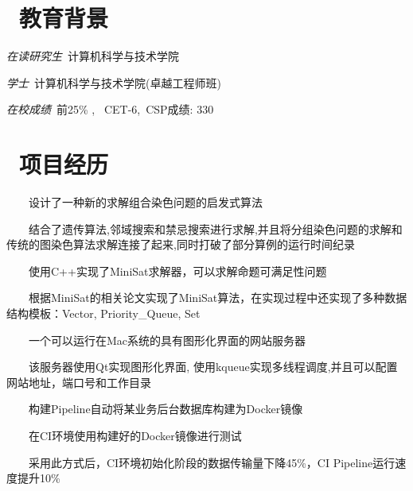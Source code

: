 \documentclass[10pt]{resume}
\begin{document}
\footnotesize


 
 
\section{\faGraduationCap\  教育背景}

\textit{在读研究生}\ 计算机科学与技术学院

\textit{学士}\ 计算机科学与技术学院(卓越工程师班)

\textit{在校成绩}\  前25\% , \ CET-6,\ CSP成绩: 330

\section{\faUsers\ 项目经历}
\ \ \ \ 设计了一种新的求解组合染色问题的启发式算法

\ \ \ \ 结合了遗传算法,邻域搜索和禁忌搜索进行求解,并且将分组染色问题的求解和传统的图染色算法求解连接了起来,同时打破了部分算例的运行时间纪录


\begin{onehalfspacing}
\ \ \ \ 使用C++实现了MiniSat求解器，可以求解命题可满足性问题

\ \ \ \ 根据MiniSat的相关论文实现了MiniSat算法，在实现过程中还实现了多种数据结构模板：Vector, Priority\_Queue, Set
\end{onehalfspacing}

\ \ \ \ 一个可以运行在Mac系统的具有图形化界面的网站服务器

\ \ \ \ 该服务器使用Qt实现图形化界面, 使用kqueue实现多线程调度,并且可以配置网站地址，端口号和工作目录

\begin{onehalfspacing}
\ \ \ \ 构建Pipeline自动将某业务后台数据库构建为Docker镜像

\ \ \ \ 在CI环境使用构建好的Docker镜像进行测试

\ \ \ \ 采用此方式后，CI环境初始化阶段的数据传输量下降45\%，CI Pipeline运行速度提升10\%


\end{onehalfspacing}
\end{document}
